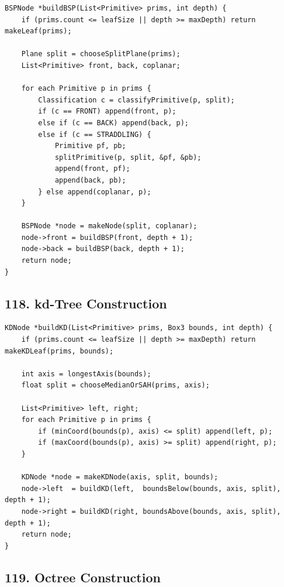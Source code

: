 \documentclass[10pt,letterpaper]{article}
\begin{document}
\begin{verbatim}
BSPNode *buildBSP(List<Primitive> prims, int depth) {
    if (prims.count <= leafSize || depth >= maxDepth) return makeLeaf(prims);

    Plane split = chooseSplitPlane(prims);
    List<Primitive> front, back, coplanar;

    for each Primitive p in prims {
        Classification c = classifyPrimitive(p, split);
        if (c == FRONT) append(front, p);
        else if (c == BACK) append(back, p);
        else if (c == STRADDLING) {
            Primitive pf, pb;
            splitPrimitive(p, split, &pf, &pb);
            append(front, pf);
            append(back, pb);
        } else append(coplanar, p);
    }

    BSPNode *node = makeNode(split, coplanar);
    node->front = buildBSP(front, depth + 1);
    node->back = buildBSP(back, depth + 1);
    return node;
}
\end{verbatim}

\subsection{118. kd-Tree Construction}

\begin{verbatim}
KDNode *buildKD(List<Primitive> prims, Box3 bounds, int depth) {
    if (prims.count <= leafSize || depth >= maxDepth) return makeKDLeaf(prims, bounds);

    int axis = longestAxis(bounds);
    float split = chooseMedianOrSAH(prims, axis);

    List<Primitive> left, right;
    for each Primitive p in prims {
        if (minCoord(bounds(p), axis) <= split) append(left, p);
        if (maxCoord(bounds(p), axis) >= split) append(right, p);
    }

    KDNode *node = makeKDNode(axis, split, bounds);
    node->left  = buildKD(left,  boundsBelow(bounds, axis, split), depth + 1);
    node->right = buildKD(right, boundsAbove(bounds, axis, split), depth + 1);
    return node;
}
\end{verbatim}

\subsection{119. Octree Construction}
\end{document}

